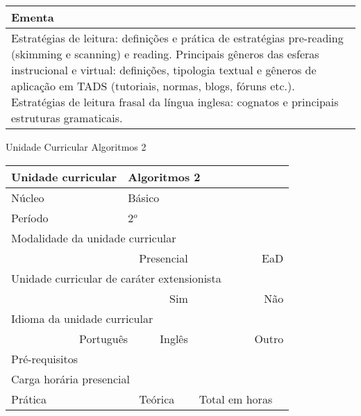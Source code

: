 \begin{quadro}[ht!]
\begin{tabular}{|p{3cm} p{2cm} p{3cm} p{2cm} p{3cm} p{2cm}|}
\multicolumn{6}{|p{15cm}|}{\cellcolor{blue1} Ementa} \\\hline
\hline\multicolumn{6}{|p{15cm}|}{\scriptsize  Estratégias de leitura: definições e prática de estratégias pre-reading (skimming e scanning) e reading. Principais gêneros das esferas instrucional e virtual: definições, tipologia textual e gêneros de aplicação em TADS (tutoriais, normas, blogs, fóruns etc.).  Estratégias de leitura frasal da língua inglesa: cognatos e principais estruturas gramaticais.}\\\hline 
\hline
	\end{tabular}
\end{quadro}


\begin{quadro}[ht!]
  \centering\scriptsize
\caption{Unidade Curricular Algoritmos 2}
\begin{tabular}{|p{3cm} p{2cm} p{3cm} p{2cm} p{3cm} p{2cm}|}\hline
\multicolumn{1}{|p{3cm}|}{\cellcolor{blue1} Unidade curricular} & \multicolumn{5}{p{9cm}|}{Algoritmos 2}\\\hline
\multicolumn{1}{|p{3cm}|}{\cellcolor{blue1} Núcleo} & \multicolumn{5}{p{11.5cm}|}{Básico}\\\hline
\multicolumn{1}{|p{3cm}|}{\cellcolor{blue1} Período} & \multicolumn{5}{p{9cm}|}{2$^o$}\\\hline
\multicolumn{6}{|p{15cm}|}{\cellcolor{blue1} Modalidade da unidade curricular} \\\hline
\multicolumn{2}{|r}{		} &  \multicolumn{2}{r}{Presencial \XBox} & \multicolumn{2}{r|}{EaD \Square	} \\\hline
\multicolumn{6}{|p{15cm}|}{\cellcolor{blue1} Unidade curricular de caráter extensionista} \\\hline
\multicolumn{4}{|r}{			Sim \XBox	} & \multicolumn{2}{r|}{	Não \Square	}\\\hline
\multicolumn{6}{|p{15cm}|}{\cellcolor{blue1} Idioma da unidade curricular} \\ \hline
\multicolumn{2}{|r}{	Português \XBox	} &  \multicolumn{2}{r}{	Inglês \Square	} & \multicolumn{2}{r|}{	Outro \Square	} \\ \hline
\multicolumn{1}{|p{3cm}|}{\cellcolor{blue1} Pré-requisitos} & \multicolumn{5}{p{9cm}|}{}\\ \hline
\multicolumn{6}{|p{15cm}|}{\cellcolor{blue1} Carga horária presencial} \\ \hline
\multicolumn{1}{|p{3cm}|}{\raggedleft Prática} & \multicolumn{1}{p{1cm}|}{\centering	30	} &  \multicolumn{1}{p{3cm}|}{\raggedleft Teórica}  & \multicolumn{1}{p{1cm}|}{\centering 	30	} & \multicolumn{1}{p{3cm}|}{\raggedleft Total em horas} & \multicolumn{1}{p{1cm}|}{\raggedleft	60	} \\ \hline 

\end{tabular}
\end{quadro}
